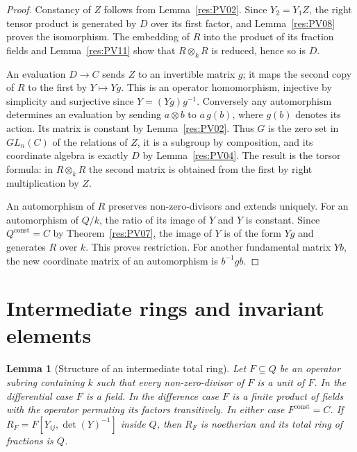\documentclass[11pt,oneside,openany]{book}
\newtheorem{lemma}[theorem]{Lemma}
\theoremstyle{definition}
\theoremstyle{remark}
\begin{document}
\begin{proof}
Constancy of \(Z\) follows from Lemma~\ref{res:PV02}. Since
\(Y_2=Y_1Z\), the right tensor product is generated by \(D\)
over its first factor, and Lemma~\ref{res:PV08} proves the
isomorphism. The embedding of \(R\) into the product of its
fraction fields and Lemma~\ref{res:PV11} show that
\(R\otimes_k R\) is reduced, hence so is \(D\).

An evaluation \(D\to C\) sends \(Z\) to an invertible matrix \(g\);
it maps the second copy of \(R\) to the first by \(Y\mapsto Yg\).
This is an operator homomorphism, injective by simplicity and
surjective since \(Y=(Yg)g^{-1}\). Conversely any automorphism
determines an evaluation by sending \(a\otimes b\) to \(a\,g(b)\),
where \(g(b)\) denotes its action. Its matrix is constant by
Lemma~\ref{res:PV02}. Thus \(G\) is the zero set in \(GL_n(C)\)
of the relations of \(Z\), it is a subgroup by composition,
and its coordinate algebra is exactly \(D\) by
Lemma~\ref{res:PV04}. The result is the torsor formula: in
\(R\otimes_k R\) the second matrix is obtained from the first by
right multiplication by \(Z\).

An automorphism of \(R\) preserves non-zero-divisors and
extends uniquely. For an automorphism of \(Q/k\), the ratio of its
image of \(Y\) and \(Y\) is constant. Since \(Q^{\mathrm{const}}=C\)
by Theorem~\ref{res:PV07}, the image of \(Y\) is of the form \(Yg\)
and generates \(R\) over \(k\). This proves restriction. For
another fundamental matrix \(Yb\), the new coordinate matrix of
an automorphism is \(b^{-1}gb\).
\end{proof}

\section{Intermediate rings and invariant elements}

\begin{lemma}[Structure of an intermediate total ring]
\label{res:PV13}
Let \(F\subseteq Q\) be an operator subring containing \(k\)
such that every non-zero-divisor of \(F\) is a unit of \(F\).
In the differential case \(F\) is a field. In the difference
case \(F\) is a finite product of fields with the operator permuting
its factors transitively. In either case \(F^{\mathrm{const}}=C\).
If \(R_F=F[Y_{ij},\det(Y)^{-1}]\) inside \(Q\), then \(R_F\)
is noetherian and its total ring of fractions is \(Q\).
\end{lemma}
\end{document}
